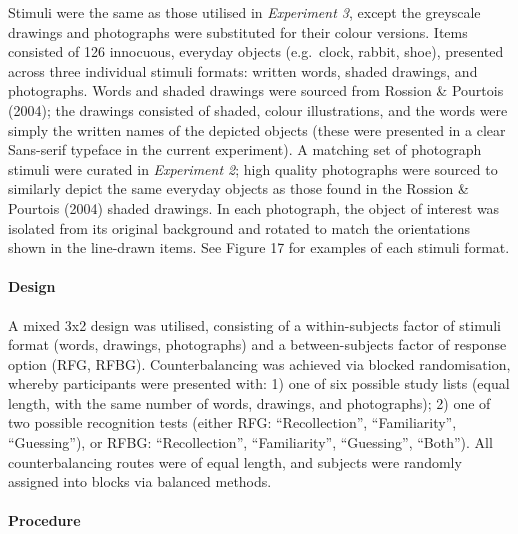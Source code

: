 \documentclass[
  11pt,
]{article}
\begin{document}
\hfill\break Stimuli were the same as those utilised in \emph{Experiment
3}, except the greyscale drawings and photographs were substituted for
their colour versions. Items consisted of 126 innocuous, everyday
objects (e.g.~clock, rabbit, shoe), presented across three individual
stimuli formats: written words, shaded drawings, and photographs. Words
and shaded drawings were sourced from Rossion \& Pourtois (2004); the
drawings consisted of shaded, colour illustrations, and the words were
simply the written names of the depicted objects (these were presented
in a clear Sans-serif typeface in the current experiment). A matching
set of photograph stimuli were curated in \emph{Experiment 2}; high
quality photographs were sourced to similarly depict the same everyday
objects as those found in the Rossion \& Pourtois (2004) shaded
drawings. In each photograph, the object of interest was isolated from
its original background and rotated to match the orientations shown in
the line-drawn items. See Figure 17 for examples of each stimuli format.

\hypertarget{design-3}{%
\paragraph{Design}\label{design-3}}

\hfill\break A mixed 3x2 design was utilised, consisting of a
within-subjects factor of stimuli format (words, drawings, photographs)
and a between-subjects factor of response option (RFG, RFBG).
Counterbalancing was achieved via blocked randomisation, whereby
participants were presented with: 1) one of six possible study lists
(equal length, with the same number of words, drawings, and
photographs); 2) one of two possible recognition tests (either RFG:
``Recollection'', ``Familiarity'', ``Guessing''), or RFBG:
``Recollection'', ``Familiarity'', ``Guessing'', ``Both''). All
counterbalancing routes were of equal length, and subjects were randomly
assigned into blocks via balanced methods.

\hypertarget{procedure-3}{%
\paragraph{Procedure}\label{procedure-3}}
\end{document}
